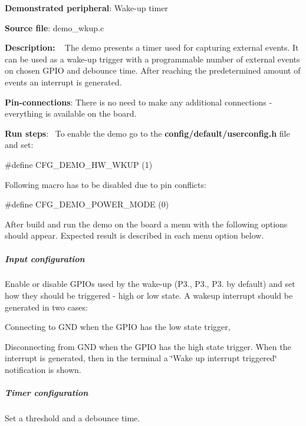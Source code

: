 \begin{DoxyItemize}
\item {\bfseries Demonstrated peripheral}\+: Wake-\/up timer
\item {\bfseries Source file}\+: demo\+\_\+wkup.\+c
\item {\bfseries Description\+:} ~\newline
 The demo presents a timer used for capturing external events. It can be used as a wake-\/up trigger with a programmable number of external events on chosen G\+P\+I\+O and debounce time. After reaching the predetermined amount of events an interrupt is generated.
\item {\bfseries Pin-\/connections}\+: There is no need to make any additional connections -\/ everything is available on the board.
\item {\bfseries Run steps}\+:~\newline
 To enable the demo go to the {\bfseries {\ttfamily config/default/userconfig.\+h}} file and set\+: 
\begin{DoxyCode}
\textcolor{preprocessor}{#define CFG\_DEMO\_HW\_WKUP      (1)}
\end{DoxyCode}
 Following macro has to be disabled due to pin conflicts\+: 
\begin{DoxyCode}
\textcolor{preprocessor}{#define CFG\_DEMO\_POWER\_MODE   (0)}
\end{DoxyCode}
 After build and run the demo on the board a menu with the following options should appear. Expected result is described in each menu option below.
\end{DoxyItemize}

\subparagraph*{Input configuration}

Enable or disable G\+P\+I\+Os used by the wake-\/up (P3., P3., P3. by default) and set how they should be triggered -\/ high or low state. A wakeup interrupt should be generated in two cases\+:
\begin{DoxyItemize}
\item Connecting to G\+N\+D when the G\+P\+I\+O has the low state trigger,
\item Disconnecting from G\+N\+D when the G\+P\+I\+O has the high state trigger. When the interrupt is generated, then in the terminal a \char`\"{}\+Wake up interrupt triggered\char`\"{} notification is shown.
\end{DoxyItemize}

\subparagraph*{Timer configuration}

Set a threshold and a debounce time.

